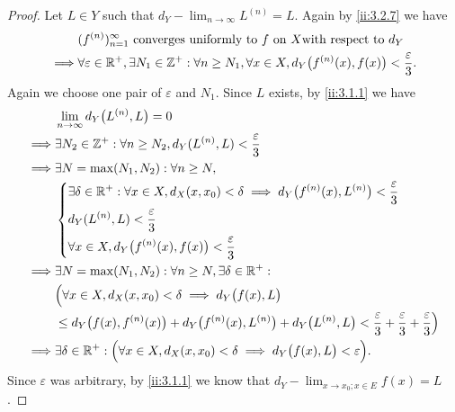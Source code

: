 \begin{proof}
  Let \(L \in Y\) such that \(d_Y - \lim_{n \to \infty} L^{(n)} = L\).
  Again by \cref{ii:3.2.7} we have
  \begin{align*}
             & (f^{(n)})_{n = 1}^\infty \text{ converges uniformly to } f \text{ on } X \text{with respect to } d_Y                                              \\
    \implies & \forall \varepsilon \in \mathbb{R}^+, \exists N_1 \in \mathbb{Z}^+ : \forall n \geq N_1, \forall x \in X, d_Y\big(f^{(n)}(x), f(x)\big) < \dfrac{\varepsilon}{3}.
  \end{align*}
  Again we choose one pair of \(\varepsilon\) and \(N_1\).
  Since \(L\) exists, by \cref{ii:3.1.1} we have
  \begin{align*}
             & \lim_{n \to \infty} d_Y\big(L^{(n)}, L\big) = 0                                                                                                                                 \\
    \implies & \exists N_2 \in \mathbb{Z}^+ : \forall n \geq N_2, d_Y(L^{(n)}, L) < \dfrac{\varepsilon}{3}                                                                                             \\
    \implies & \exists N = \max(N_1, N_2) : \forall n \geq N,                                                                                                                                  \\
             & \begin{dcases}
                 \exists \delta \in \mathbb{R}^+ : \forall x \in X, d_X(x, x_0) < \delta \implies d_Y\big(f^{(n)}(x), L^{(n)}\big) < \dfrac{\varepsilon}{3} \\
                 d_Y(L^{(n)}, L) < \dfrac{\varepsilon}{3}                                                                                           \\
                 \forall x \in X, d_Y\big(f^{(n)}(x), f(x)\big) < \dfrac{\varepsilon}{3}
               \end{dcases}                                              \\
    \implies & \exists N = \max(N_1, N_2) : \forall n \geq N, \exists \delta \in \mathbb{R}^+ :                                                                                                        \\
             & \Big(\forall x \in X, d_X(x, x_0) < \delta \implies d_Y\big(f(x), L\big)                                                                                                        \\
             & \leq d_Y\big(f(x), f^{(n)}(x)\big) + d_Y\big(f^{(n)}(x), L^{(n)}\big) + d_Y\big(L^{(n)}, L\big) < \dfrac{\varepsilon}{3} + \dfrac{\varepsilon}{3} + \dfrac{\varepsilon}{3}\Big) \\
    \implies & \exists \delta \in \mathbb{R}^+ : \Big(\forall x \in X, d_X(x, x_0) < \delta \implies d_Y\big(f(x), L\big) < \varepsilon\Big).
  \end{align*}
  Since \(\varepsilon\) was arbitrary, by \cref{ii:3.1.1} we know that \(d_Y - \lim_{x \to x_0 ; x \in E} f(x) = L\).
\end{proof}

